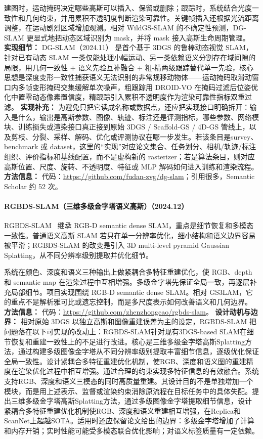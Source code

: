 建图时，运动掩码决定哪些高斯可以插入、保留或删除；跟踪时，系统结合光度一致性和几何约束，并用累积不透明度判断渲染可靠性。关键帧插入还根据光流距离调整，在运动剧烈区域增加观测。相对 WildGS-SLAM 的不确定性预测，DG-SLAM 更显式地把动态区域识别为 mask，并将 mask 接入高斯生命周期管理。
\textbf{实现细节：} DG-SLAM（2024.11） 是首个基于 3DGS 的鲁棒动态视觉 SLAM，针对已有动态 SLAM 一类仅能处理小幅运动、另一类依赖语义分割存在域间隙的局限，用几何一致性 + 语义先验互补融合 + 粗-精两级跟踪替代单一先验，核心思想是深度变形一致性捕获语义无法识别的非常规移动物体——运动掩码取滑动窗口内多帧变形掩码交集缓解单次噪声，粗跟踪用 DROID-VO 在掩码过滤后位姿优化中置零动态像素置信度，精跟踪引入累积不透明度作为渲染可靠性指标双重过滤。
\textbf{实现补充：} 为避免只把它读成名称或数据点，还应把实现接口明确拆开：输入是什么，输出是高斯参数、图像、轨迹、标注还是评测指标，哪些参数、网络模块、训练损失或渲染接口真正接到原始 3DGS / Scaffold-GS / 4D-GS 管线上，以及剪枝、分裂、采样、解码、优化或评测协议在哪一步发生。若该条目是survey、benchmark 或 dataset，这里的“实现”对应论文集合、任务划分、相机/轨迹/标注组织、评价指标和基线配置，而不是虚构新的 rasterizer；若是算法条目，则对应高斯位置、尺度、旋转、不透明度、特征或 MLP 解码如何进入训练和渲染流程。
\textbf{方法信息：} 代码：\url{https://github.com/fudan-zvg/dg-slam}；引用很多，Semantic Scholar 约 52 次。



\paragraph{RGBDS-SLAM（三维多级金字塔语义高斯）（2024.12）}
RGBDS-SLAM~\cite{2412_01217} 继承 RGB-D semantic dense SLAM，重点是细节恢复和多模态一致性。普通语义高斯 SLAM 若只在单一分辨率优化，细小结构和语义边界容易被平滑；RGBDS-SLAM 的改变是引入 3D multi-level pyramid Gaussian Splatting，从不同分辨率级别提取并优化细节。

系统在颜色、深度和语义三种输出上做紧耦合多特征重建优化，使 RGB、depth 和 semantic map 在渲染过程中互相增强。多级金字塔先保证全局一致，再逐层补充局部细节。项目实现围绕 RGB-D semantic dense SLAM。相对 GS3LAM，它的重点不是解析雅可比或遗忘控制，而是多尺度表示如何改善语义和几何边界。
\textbf{方法信息：} 代码：\url{https://github.com/zhenzhongcao/rgbds-slam}。
\textbf{设计动机与边界：} 相对原始 3DGS 以独立高斯和图像重建误差为主的设定，RGBDS-SLAM 把问题落在以下可实现的改动上：RGBDS-SLAM针对现有3DGS-based SLAM在细节恢复和重建一致性上的不足进行改进。核心是三维多级金字塔高斯Splatting方法，通过构建多级图像金字塔从不同分辨率级别提取丰富细节信息，逐级优化保证全局一致性。设计紧耦合多特征重建优化机制，使RGB、深度和语义图的重建精度在渲染优化过程中相互增强。通过合理的约束实现多特征信息的有效融合。系统支持RGB、深度和语义三模态的同时高质量重建。其设计目的不是单独增加一个模块，而是用上述表示、监督或渲染约束消除原流程在目标任务中的具体失配。提出三维多级金字塔高斯Splatting方法，通过多级图像金字塔提取细节信息，设计紧耦合多特征重建优化机制使RGB、深度和语义重建相互增强，在Replica和ScanNet上超越SOTA。适用时还应保留论文给出的边界：多级金字塔增加了计算和内存开销；实时性能可能受多模态联合优化影响；对语义标签质量有一定依赖。
